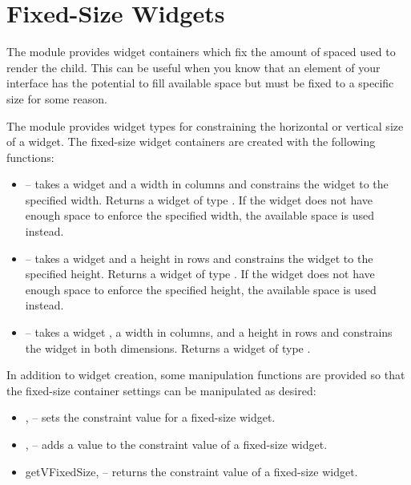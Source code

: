 \section{Fixed-Size Widgets}
\label{sec:fixed}

The  module provides widget containers which fix the amount
of spaced used to render the child.  This can be useful when you know
that an element of your interface has the potential to fill available
space but must be fixed to a specific size for some reason.

The module provides widget types for constraining the horizontal or
vertical size of a widget.  The fixed-size widget containers are
created with the following functions:

\begin{itemize}
\item {} -- takes a widget  and a width in
  columns and constrains the widget to the specified width.  Returns a
  widget of type .  If the  widget
  does not have enough space to enforce the specified width, the
  available space is used instead.
\item {} -- takes a widget  and a height in rows
  and constrains the widget to the specified height.  Returns a widget
  of type .  If the  widget does not
  have enough space to enforce the specified height, the available
  space is used instead.
\item {} -- takes a widget , a width in
  columns, and a height in rows and constrains the widget in both
  dimensions.  Returns a widget of type .
\end{itemize}

In addition to widget creation, some manipulation functions are
provided so that the fixed-size container settings can be manipulated
as desired:

\begin{itemize}
\item {},  -- sets the constraint value for
  a fixed-size widget.
\item {},  -- adds a value to the
  constraint value of a fixed-size widget.
\item {getVFixedSize},  -- returns the constraint
  value of a fixed-size widget.
\end{itemize}

